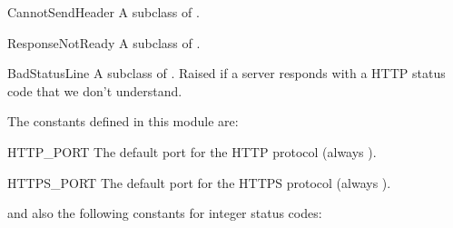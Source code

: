 \begin{excdesc}{CannotSendHeader}
A subclass of .
\end{excdesc}

\begin{excdesc}{ResponseNotReady}
A subclass of .
\end{excdesc}

\begin{excdesc}{BadStatusLine}
A subclass of .  Raised if a server responds with a
HTTP status code that we don't understand.
\end{excdesc}

The constants defined in this module are:

\begin{datadesc}{HTTP_PORT}
  The default port for the HTTP protocol (always ).
\end{datadesc}

\begin{datadesc}{HTTPS_PORT}
  The default port for the HTTPS protocol (always ).
\end{datadesc}

and also the following constants for integer status codes:

